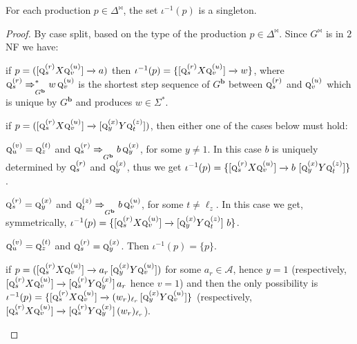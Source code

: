 \documentclass[final]{llncs}
\newcommand{\arrow}[2]{\xrightarrow{{\scriptscriptstyle #1}}}
\def\pat{{\mathbf{b}}}
\begin{document}
\begin{proposition}\label{prop:singleton}
For each production $p \in \Delta^\bowtie$, the set $\iota^{-1}(p)$ is a singleton. 
\end{proposition}
\begin{proof}
By case split, based on the type of the production $p \in
\Delta^\bowtie$. Since $G^\bowtie$ is in $2$NF we have: 
\begin{compactitem}
\item if $p = ([\textsc{q}^{(r)}_{s} X \textsc{q}_{v}^{(u)}] \arrow{}{}
  a)$ then $\iota^{-1}(p) = \{[\textsc{q}^{(r)}_{s} X
      \textsc{q}_{v}^{(u)}] \arrow{}{} w\}$, where $\textsc{q}^{(r)}_{s}
  \xRightarrow{}^*_{G^\pat} w\, \textsc{q}_{v}^{(u)}$ is the shortest
	step sequence of $G^\pat$ between \(\textsc{q}^{(r)}_{s}\) and \(\textsc{q}^{(u)}_{v}\) which is unique by \(G^{\pat}\) and produces $w \in \Sigma^*$.

\item if $p = ([\textsc{q}^{(r)}_{s} X \textsc{q}_{v}^{(u)}] \arrow{}{}
  [\textsc{q}_{y}^{(x)} Y \textsc{q}_{t}^{(z)}])$, then either one of
  the cases below must hold:
  \begin{compactenum}
	\item \(\textsc{q}_{u}^{(v)}=\textsc{q}_{z}^{(t)}\) and $\textsc{q}^{(r)}_{s} \xRightarrow{}_{G^\pat}
    b\, \textsc{q}_{y}^{(x)}$, for some \(y\neq 1\). In this case $b$ is
    uniquely determined by $\textsc{q}^{(r)}_{s}$ and 
    $\textsc{q}_{y}^{(x)}$, thus we get $\iota^{-1}(p) = \{[\textsc{q}^{(r)}_{s} X
      \textsc{q}_{v}^{(u)}] \arrow{}{} b~[\textsc{q}_{y}^{(x)} Y
      \textsc{q}_{t}^{(z)}]\}$. 
		\item \(\textsc{q}_{s}^{(r)}=\textsc{q}_{y}^{(x)}\) and $\textsc{q}_{t}^{(z)}
      \xRightarrow{}_{G^\pat} b \,\textsc{q}_{v}^{(u)}$, for some \(t\neq\ell_z\). In this case we get, symmetrically, $\iota^{-1}(p)
      = \{[\textsc{q}^{(r)}_{s} X \textsc{q}_{v}^{(u)}] \arrow{}{}
      [\textsc{q}_{y}^{(x)} Y \textsc{q}_{t}^{(z)}]~b\}$.
		\item \(\textsc{q}_{u}^{(v)}=\textsc{q}_{z}^{(t)}\) and \(\textsc{q}_{s}^{(r)}=\textsc{q}_{y}^{(x)}\). Then $\iota^{-1}(p) = \{p\}$. 
  \end{compactenum}

\item if $p = ([\textsc{q}^{(r)}_{s} X \textsc{q}_{v}^{(u)}] \arrow{}{}
  a_r\, [\textsc{q}_{y}^{(x)} Y \textsc{q}_{v}^{(u)}])$  for some $a_r \in \mathcal{A}$, hence \(y=1\) (respectively,
  $[\textsc{q}^{(r)}_{s} X \textsc{q}_{v}^{(u)}] \arrow{}{}
  [\textsc{q}^{(r)}_{s} Y \textsc{q}_{y}^{(x)}]\, a_r$ hence \(v=1\)) and then the only possibility is $\iota^{-1}(p) =
	\{[\textsc{q}^{(r)}_{s} X \textsc{q}_{v}^{(u)}] \arrow{}{} (w_r)_{\ell_{r}}\,
	[\textsc{q}_{y}^{(x)} Y \textsc{q}_{v}^{(u)}]\}$ (respectively,
	$[\textsc{q}^{(r)}_{s} X \textsc{q}_{v}^{(u)}] \arrow{}{}
	[\textsc{q}^{(r)}_{s} Y \textsc{q}_{y}^{(x)}]\, (w_r)_{\ell_{r}}$).


\end{compactitem}
\end{proof}
\end{document}
